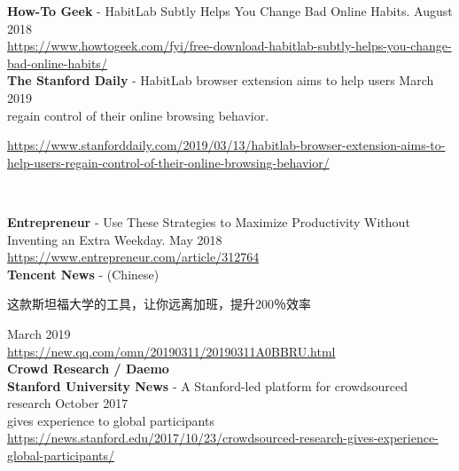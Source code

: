 \documentclass[10pt,A4]{article}
\begin{document}
\textbf{How-To Geek} - HabitLab Subtly Helps You Change Bad Online Habits. \hfill August 2018\\
\url{https://www.howtogeek.com/fyi/free-download-habitlab-subtly-helps-you-change-bad-online-habits/}\\

\textbf{The Stanford Daily} - HabitLab browser extension aims to help users \hfill March 2019\\
regain control of their online browsing behavior.\\
\begin{footnotesize}
\url{https://www.stanforddaily.com/2019/03/13/habitlab-browser-extension-aims-to-help-users-regain-control-of-their-online-browsing-behavior/}
\end{footnotesize}\\

\vspace{-4mm}

\textbf{Entrepreneur} - Use These Strategies to Maximize Productivity Without Inventing an Extra Weekday. \hfill May 2018\\
\url{https://www.entrepreneur.com/article/312764}\\



\textbf{Tencent News} - (Chinese) \begin{CJK*}{UTF8}{gbsn}这款斯坦福大学的工具，让你远离加班，提升200％效率\end{CJK*} \hfill March 2019\\
\url{https://new.qq.com/omn/20190311/20190311A0BBRU.html}\\


\textcolor{sectcol}{\textbf{Crowd Research / Daemo}}\\

\textbf{Stanford University News} - A Stanford-led platform for crowdsourced research \hfill October 2017\\
gives experience to global participants\\
\url{https://news.stanford.edu/2017/10/23/crowdsourced-research-gives-experience-global-participants/}\\
\end{document}
